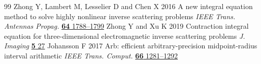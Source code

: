 \begin{thebibliography}{99}
 Zhong Y, Lambert M, Lesselier D and Chen X 2016 A new integral equation method to solve highly nonlinear inverse scattering problems \emph{IEEE Trans. Antennas Propag.} \href{https://doi.org/10.1109/TAP.2016.2535492}{\textbf{64} 1788--1799}
 Zhong Y and Xu K 2019 Contraction integral equation for three-dimensional electromagnetic inverse scattering problems \emph{J. Imaging} \href{https://doi.org/10.3390/jimaging5020027}{\textbf{5} 27}
 Johansson F 2017 Arb: efficient arbitrary-precision midpoint-radius interval arithmetic \emph{IEEE Trans. Comput.} \href{https://doi.org/10.1109/TC.2017.2690633}{\textbf{66} 1281--1292}
\end{thebibliography}
